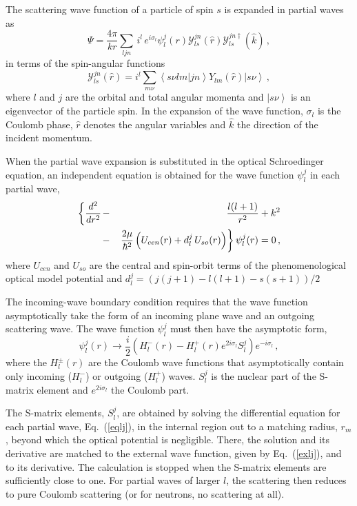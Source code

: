 The scattering wave function of a particle of spin $s$ is expanded in
partial waves as 
\begin{equation}
\Psi=%
\frac{4\pi}{kr}\sum_{ljn}\, i^{l}\, e^{i\sigma_{l}}\psi_{l}^{j}(r){\mathcal{Y%
}}_{ls}^{jn}(\hat{r}){\mathcal{Y}}_{ls}^{jn\dagger}(\hat{k})\,,
\label{parwav}
\end{equation}
in terms of the spin-angular functions 
\begin{equation}
{\mathcal{Y}}_{ls}^{jn}(\hat{r})=i^{l}\sum_{m\nu}\left\langle s\nu
lm|jn\right\rangle Y_{lm}(\hat{r})\left|s\nu\right\rangle \,,
\end{equation}
where $l$ and $j$ are the orbital and total angular momenta and $%
\left|s\nu\right\rangle $ is an eigenvector of the particle spin. In the
expansion of the wave function, $\sigma_{l}$ is the Coulomb phase, $\hat{r}$
denotes the angular variables and $\hat{k}$ the direction of the incident
momentum.

When the partial wave expansion is substituted in the optical Schroedinger
equation, an independent equation is obtained for the wave function $%
\psi_{l}^{j}$ in each partial wave, 
\begin{eqnarray}
\left\{ \frac{d^{2}}{dr^{2}}\right. & - & \frac{l(l+1)}{r^{2}}+k^{2}
\label{eqlj} \\
& - & \left.\frac{2\mu}{\hbar^{2}}\left(U_{cen}(r)+d_{l}^{j}\,
U_{so}(r)\right)\right\} \psi_{l}^{j}(r)=0\,,  \notag
\end{eqnarray}
where $U_{cen}$ and $U_{so}$ are the central and spin-orbit terms of the
phenomenological optical model potential and $%
d_{l}^{j}=(j(j+1)-l(l+1)-s(s+1))/2$

The incoming-wave boundary condition requires that the wave function
asymptotically take the form of an incoming plane wave and an outgoing
scattering wave. The wave function $\psi_{l}^{j}$ must then have the
asymptotic form, 
\begin{equation}
\psi_{l}^{j}(r)\rightarrow\frac{i}{2}\left(H_{l}^{-}(r)-H_{l}^{+}(r)e^{2i%
\sigma_{l}}S_{l}^{j}\right)e^{-i\sigma_{l}}\,,  \label{exlj}
\end{equation}
where the $H_{l}^{\pm}(r)$ are the Coulomb wave functions that
asymptotically contain only incoming ($H_{l}^{-}$) or outgoing ($H_{l}^{+}$)
waves. $S_{l}^{j}$ is the nuclear part of the S-matrix element and $%
e^{2i\sigma_{l}}$ the Coulomb part.

The S-matrix elements, $S_{l}^{j}$, are obtained by solving the differential
equation for each partial wave, Eq.~(\ref{eqlj}), in the internal region out
to a matching radius, $r_{m}$, beyond which the optical potential is
negligible. There, the solution and its derivative are matched to the
external wave function, given by Eq.~(\ref{exlj}), and to its derivative.
The calculation is stopped when the S-matrix elements are sufficiently close
to one. For partial waves of larger $l$, the scattering then reduces to pure
Coulomb scattering (or for neutrons, no scattering at all).

